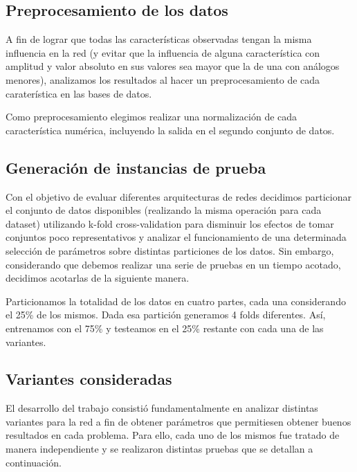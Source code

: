 \documentclass[informe.tex]{subfiles}
\begin{document}
    \vspace{15pt}

  \subsection{Preprocesamiento de los datos}
  
    A fin de lograr que todas las características observadas tengan la misma influencia en la red (y evitar que la influencia de alguna característica con amplitud y valor absoluto en sus valores sea mayor que la de una con análogos menores), analizamos los resultados al hacer un preprocesamiento de cada caraterística en las bases de datos.
    
    Como preprocesamiento elegimos realizar una normalización de cada característica numérica, incluyendo la salida en el segundo conjunto de datos.
  
  
  \subsection{Generación de instancias de prueba}

    Con el objetivo de evaluar diferentes arquitecturas de redes decidimos particionar el conjunto de datos disponibles (realizando la misma operación para cada dataset) utilizando k-fold cross-validation para disminuir los efectos de tomar conjuntos poco representativos y analizar el funcionamiento de una determinada selección de parámetros sobre distintas particiones de los datos. Sin embargo, considerando que debemos realizar una serie de pruebas en un tiempo acotado, decidimos acotarlas de la siguiente manera.
    
    Particionamos la totalidad de los datos en cuatro partes, cada una considerando el 25\% de los mismos. Dada esa partición generamos 4 folds diferentes. Así, entrenamos con el 75\% y testeamos en el 25\% restante con cada una de las variantes.
    
  \subsection{Variantes consideradas}

    El desarrollo del trabajo consisti\'o fundamentalmente en analizar distintas variantes para la red a fin de obtener par\'ametros que permitiesen obtener buenos resultados en cada problema. Para ello, cada uno de los mismos fue tratado de manera independiente y se realizaron distintas pruebas que se detallan a continuaci\'on.
\end{document}
